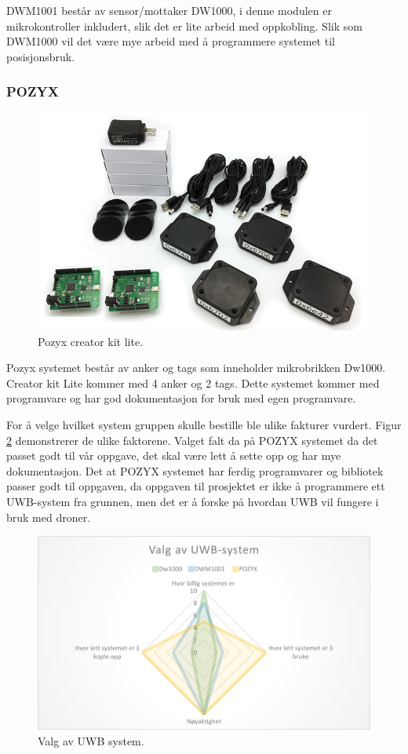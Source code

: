 DWM1001 består av sensor/mottaker DW1000, i denne modulen er mikrokontroller inkludert, slik det er lite arbeid med oppkobling. 
Slik som DWM1000 vil det være mye arbeid med å programmere systemet til posisjonsbruk. 

\subsubsection{POZYX}

\begin{figure}[htp]
\centering
\includegraphics[width=0.7\columnwidth]{figures/creatorkitlite}
\caption{Pozyx creator kit lite.}
\label{fig:creatorkitlite}
\end{figure}

Pozyx systemet består av anker og tags som inneholder mikrobrikken Dw1000.  Creator kit Lite kommer med 4 anker og 2 tags. Dette systemet kommer med programvare og har god dokumentasjon for bruk med egen programvare.   

For å velge hvilket system gruppen skulle bestille ble ulike fakturer vurdert. Figur \ref{fig:valgavsystem2} demonstrerer de ulike faktorene.  Valget falt da på POZYX systemet da det passet godt til vår oppgave, det skal være lett å sette opp og har mye dokumentasjon. 
Det at POZYX systemet har ferdig programvarer og bibliotek passer godt til oppgaven, da oppgaven til prosjektet er ikke å programmere ett UWB-system fra grunnen, men det er å forske på hvordan UWB vil fungere i bruk med droner. 

\begin{figure}[htp]
\centering
\includegraphics[width=0.7\columnwidth]{figures/valgavsystem2}
\caption{Valg av UWB system.}
\label{fig:valgavsystem2}
\end{figure}

